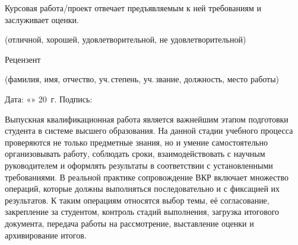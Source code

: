 \documentclass[14pt,a4paper]{extreport}
\begin{document}
\begin{singlespacing}
\vspace{0.3em}
\noindent\underline{\hspace{\textwidth}}

\vspace{0.3em}
\noindent\underline{\hspace{\textwidth}}

\vspace{0.3em}
\noindent\underline{\hspace{\textwidth}}

\vspace{0.3em}
\noindent\underline{\hspace{\textwidth}}

\vspace{0.5em}
\noindent Курсовая работа/проект отвечает предъявляемым к ней требованиям
и заслуживает\underline{\hspace{3.5cm}} оценки.

\vspace{0.3em}
\begin{center}
  \small(отличной, хорошей, удовлетворительной, не удовлетворительной)
\end{center}

\vspace{0.5em}
\noindent Рецензент \underline{\hspace{9.5cm}}

\vspace{0.3em}
\begin{center}
  \small(фамилия, имя, отчество, уч.\,степень, уч.\,звание, должность, место работы)
\end{center}

\vspace{1em}
\noindent Дата: «\underline{\;\;\;\;}» \underline{\hspace{3cm}} 20\underline{\;\;\;}~г.
\hfill Подпись: \underline{\hspace{3.5cm}}

\newpage

\renewcommand{\contentsname}{\hfill Содержание\hfill}
\tableofcontents
\end{singlespacing}
\newpage

\intro

Выпускная квалификационная работа является важнейшим этапом подготовки
студента в системе высшего образования.
На данной стадии учебного процесса проверяются не только предметные
знания, но и умение самостоятельно организовывать работу, соблюдать
сроки, взаимодействовать с научным руководителем и оформлять результаты
в соответствии с установленными требованиями.
В реальной практике сопровождение ВКР включает множество операций,
которые должны выполняться последовательно и с фиксацией их результатов.
К таким операциям относятся выбор темы, её согласование, закрепление за
студентом, контроль стадий выполнения, загрузка итогового документа,
передача работы на рассмотрение, выставление оценки и архивирование итогов.
\end{document}
